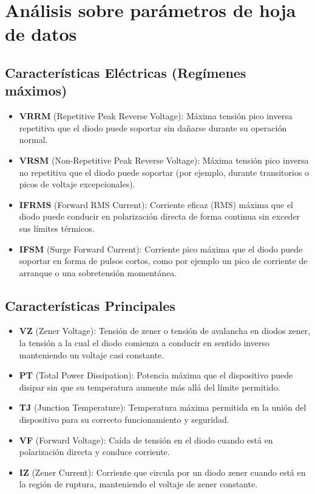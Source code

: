 \chapter{Análisis sobre parámetros de hoja de datos}

\section{Características Eléctricas (Regímenes máximos)}
\begin{itemize}
  \item \textbf{VRRM} (Repetitive Peak Reverse Voltage): Máxima tensión pico inversa repetitiva que el diodo puede soportar sin dañarse durante su operación normal.
  \item \textbf{VRSM} (Non-Repetitive Peak Reverse Voltage): Máxima tensión pico inversa no repetitiva que el diodo puede soportar (por ejemplo, durante transitorios o picos de voltaje excepcionales).
  \item \textbf{IFRMS} (Forward RMS Current): Corriente eficaz (RMS) máxima que el diodo puede conducir en polarización directa de forma continua sin exceder sus límites térmicos.
  \item \textbf{IFSM} (Surge Forward Current): Corriente pico máxima que el diodo puede soportar en forma de pulsos cortos, como por ejemplo un pico de corriente de arranque o una sobretensión momentánea.
\end{itemize}

\section{Características Principales}
\begin{itemize}
  \item \textbf{VZ} (Zener Voltage): Tensión de zener o tensión de avalancha en diodos zener, la tensión a la cual el diodo comienza a conducir en sentido inverso manteniendo un voltaje casi constante.
  \item \textbf{PT} (Total Power Dissipation): Potencia máxima que el dispositivo puede disipar sin que su temperatura aumente más allá del límite permitido.
  \item \textbf{TJ} (Junction Temperature): Temperatura máxima permitida en la unión del dispositivo para su correcto funcionamiento y seguridad.
  \item \textbf{VF} (Forward Voltage): Caída de tensión en el diodo cuando está en polarización directa y conduce corriente.
  \item \textbf{IZ} (Zener Current): Corriente que circula por un diodo zener cuando está en la región de ruptura, manteniendo el voltaje de zener constante.
\end{itemize}

